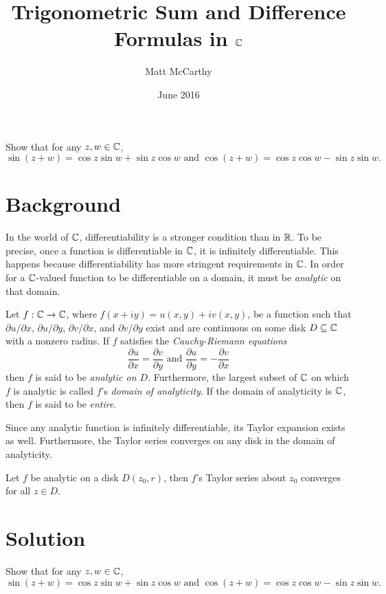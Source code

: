 \documentclass[notitlepage]{problem-solving}
\author{Matt McCarthy}
\title{Trigonometric Sum and Difference Formulas in $\mathbb{C}$}
\date{June 2016}
\begin{document}
\maketitle

\begin{problem*}
	Show that for any $z,w\in\mathbb{C}$,
	\[
		\sin(z+w)=\cos z\sin w+\sin z\cos w \text{ and } \cos(z+w)=\cos z\cos w - \sin z\sin w.
	\]
\end{problem*}

\section{Background}

In the world of $\mathbb{C}$, differentiability is a stronger condition than in $\mathbb{R}$.
To be precise, once a function is differentiable in $\mathbb{C}$, it is infinitely differentiable.
This happens because differentiability has more stringent requirements in $\mathbb{C}$.
In order for a $\mathbb{C}$-valued function to be differentiable on a domain, it must be \textit{analytic} on that domain.
\begin{definition}
	Let $f:\mathbb{C}\rightarrow\mathbb{C}$, where $f(x+iy)=u(x,y)+iv(x,y)$, be a function such that $\partial u/\partial x$, $\partial u/\partial y$, $\partial v/\partial x$, and $\partial v/\partial y$ exist and are continuous on some disk $D\subseteq\mathbb{C}$ with a nonzero radius.
	If $f$ satisfies the \textit{Cauchy-Riemann equations}
	\[
		\frac{\partial u}{\partial x} = \frac{\partial v}{\partial y} \text{ and } \frac{\partial u}{\partial y} = -\frac{\partial v}{\partial x}
	\]
	then $f$ is said to be \textit{analytic on $D$}.
	Furthermore, the largest subset of $\mathbb{C}$ on which $f$ is analytic is called $f$'s \textit{domain of analyticity}.
	If the domain of analyticity is $\mathbb{C}$, then $f$ is said to be \textit{entire}.
\end{definition}
Since any analytic function is infinitely differentiable, its Taylor expansion exists as well.
Furthermore, the Taylor series converges on any disk in the domain of analyticity.
\begin{thm}
	Let $f$ be analytic on a disk $D(z_0,r)$, then $f$'s Taylor series about $z_0$ converges for all $z\in D$.
\end{thm}

\section{Solution}

\begin{problem*}
	Show that for any $z,w\in\mathbb{C}$,
	\[
		\sin(z+w)=\cos z\sin w+\sin z\cos w \text{ and } \cos(z+w)=\cos z\cos w - \sin z\sin w.
	\]
\end{problem*}
\end{document}
